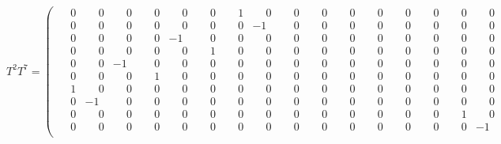 \documentclass[10pt]{article}
\begin{document}
\[
T^{2}T^{7} = \left(\begin{smallmatrix}
\phantom{-}0 & \phantom{-}0 & \phantom{-}0 & \phantom{-}0 & \phantom{-}0 & \phantom{-}0 & \phantom{-}1 & \phantom{-}0 & \phantom{-}0 & \phantom{-}0 & \phantom{-}0 & \phantom{-}0 & \phantom{-}0 & \phantom{-}0 & \phantom{-}0 & \phantom{-}0 \\
\phantom{-}0 & \phantom{-}0 & \phantom{-}0 & \phantom{-}0 & \phantom{-}0 & \phantom{-}0 & \phantom{-}0 & -1 & \phantom{-}0 & \phantom{-}0 & \phantom{-}0 & \phantom{-}0 & \phantom{-}0 & \phantom{-}0 & \phantom{-}0 & \phantom{-}0 \\
\phantom{-}0 & \phantom{-}0 & \phantom{-}0 & \phantom{-}0 & -1 & \phantom{-}0 & \phantom{-}0 & \phantom{-}0 & \phantom{-}0 & \phantom{-}0 & \phantom{-}0 & \phantom{-}0 & \phantom{-}0 & \phantom{-}0 & \phantom{-}0 & \phantom{-}0 \\
\phantom{-}0 & \phantom{-}0 & \phantom{-}0 & \phantom{-}0 & \phantom{-}0 & \phantom{-}1 & \phantom{-}0 & \phantom{-}0 & \phantom{-}0 & \phantom{-}0 & \phantom{-}0 & \phantom{-}0 & \phantom{-}0 & \phantom{-}0 & \phantom{-}0 & \phantom{-}0 \\
\phantom{-}0 & \phantom{-}0 & -1 & \phantom{-}0 & \phantom{-}0 & \phantom{-}0 & \phantom{-}0 & \phantom{-}0 & \phantom{-}0 & \phantom{-}0 & \phantom{-}0 & \phantom{-}0 & \phantom{-}0 & \phantom{-}0 & \phantom{-}0 & \phantom{-}0 \\
\phantom{-}0 & \phantom{-}0 & \phantom{-}0 & \phantom{-}1 & \phantom{-}0 & \phantom{-}0 & \phantom{-}0 & \phantom{-}0 & \phantom{-}0 & \phantom{-}0 & \phantom{-}0 & \phantom{-}0 & \phantom{-}0 & \phantom{-}0 & \phantom{-}0 & \phantom{-}0 \\
\phantom{-}1 & \phantom{-}0 & \phantom{-}0 & \phantom{-}0 & \phantom{-}0 & \phantom{-}0 & \phantom{-}0 & \phantom{-}0 & \phantom{-}0 & \phantom{-}0 & \phantom{-}0 & \phantom{-}0 & \phantom{-}0 & \phantom{-}0 & \phantom{-}0 & \phantom{-}0 \\
\phantom{-}0 & -1 & \phantom{-}0 & \phantom{-}0 & \phantom{-}0 & \phantom{-}0 & \phantom{-}0 & \phantom{-}0 & \phantom{-}0 & \phantom{-}0 & \phantom{-}0 & \phantom{-}0 & \phantom{-}0 & \phantom{-}0 & \phantom{-}0 & \phantom{-}0 \\
\phantom{-}0 & \phantom{-}0 & \phantom{-}0 & \phantom{-}0 & \phantom{-}0 & \phantom{-}0 & \phantom{-}0 & \phantom{-}0 & \phantom{-}0 & \phantom{-}0 & \phantom{-}0 & \phantom{-}0 & \phantom{-}0 & \phantom{-}0 & \phantom{-}1 & \phantom{-}0 \\
\phantom{-}0 & \phantom{-}0 & \phantom{-}0 & \phantom{-}0 & \phantom{-}0 & \phantom{-}0 & \phantom{-}0 & \phantom{-}0 & \phantom{-}0 & \phantom{-}0 & \phantom{-}0 & \phantom{-}0 & \phantom{-}0 & \phantom{-}0 & \phantom{-}0 & -1 \\

\end{smallmatrix}\]
\end{document}
